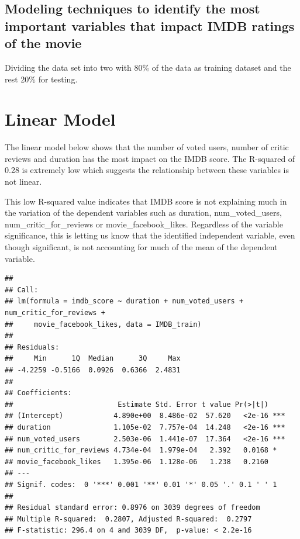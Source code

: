 \documentclass[
]{article}
\begin{document}
\hypertarget{modeling-techniques-to-identify-the-most-important-variables-that-impact-imdb-ratings-of-the-movie}{%
\subsection{Modeling techniques to identify the most important variables
that impact IMDB ratings of the
movie}\label{modeling-techniques-to-identify-the-most-important-variables-that-impact-imdb-ratings-of-the-movie}}

Dividing the data set into two with 80\% of the data as training dataset
and the rest 20\% for testing.

\hypertarget{linear-model}{%
\section{Linear Model}\label{linear-model}}

The linear model below shows that the number of voted users, number of
critic reviews and duration has the most impact on the IMDB score. The
R-squared of 0.28 is extremely low which suggests the relationship
between these variables is not linear.

This low R-squared value indicates that IMDB score is not explaining
much in the variation of the dependent variables such as duration,
num\_voted\_users, num\_critic\_for\_reviews or movie\_facebook\_likes.
Regardless of the variable significance, this is letting us know that
the identified independent variable, even though significant, is not
accounting for much of the mean of the dependent variable.

\begin{verbatim}
## 
## Call:
## lm(formula = imdb_score ~ duration + num_voted_users + num_critic_for_reviews + 
##     movie_facebook_likes, data = IMDB_train)
## 
## Residuals:
##     Min      1Q  Median      3Q     Max 
## -4.2259 -0.5166  0.0926  0.6366  2.4831 
## 
## Coefficients:
##                         Estimate Std. Error t value Pr(>|t|)    
## (Intercept)            4.890e+00  8.486e-02  57.620   <2e-16 ***
## duration               1.105e-02  7.757e-04  14.248   <2e-16 ***
## num_voted_users        2.503e-06  1.441e-07  17.364   <2e-16 ***
## num_critic_for_reviews 4.734e-04  1.979e-04   2.392   0.0168 *  
## movie_facebook_likes   1.395e-06  1.128e-06   1.238   0.2160    
## ---
## Signif. codes:  0 '***' 0.001 '**' 0.01 '*' 0.05 '.' 0.1 ' ' 1
## 
## Residual standard error: 0.8976 on 3039 degrees of freedom
## Multiple R-squared:  0.2807, Adjusted R-squared:  0.2797 
## F-statistic: 296.4 on 4 and 3039 DF,  p-value: < 2.2e-16
\end{verbatim}
\end{document}
